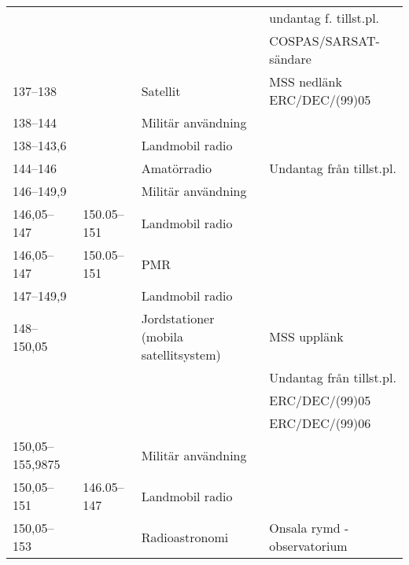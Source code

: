 \begin{landscape}
\begin{longtable}{llll}
	                   &                    &                                       & undantag f. tillst.pl.         \\
	                   &                    &                                       & COSPAS/SARSAT-sändare          \\
	137--138           &                    & Satellit                              & MSS nedlänk ERC/DEC/(99)05     \\
	138--144           &                    & Militär användning                    &                                \\
	138--143,6         &                    & Landmobil radio                       &                                \\
	144--146           &                    & Amatörradio                           & Undantag från tillst.pl.       \\
	146--149,9         &                    & Militär användning                    &                                \\
	146,05--147        & 150.05--151        & Landmobil radio                       &                                \\
	146,05--147        & 150.05--151        & PMR                                   &                                \\
	147--149,9         &                    & Landmobil radio                       &                                \\
	148--150,05        &                    & Jordstationer (mobila satellitsystem) & MSS upplänk                    \\
	                   &                    &                                       & Undantag från tillst.pl.       \\
	                   &                    &                                       & ERC/DEC/(99)05                 \\
	                   &                    &                                       & ERC/DEC/(99)06                 \\
	150,05--155,9875   &                    & Militär användning                    &                                \\
	150,05--151        & 146.05--147        & Landmobil radio                       &                                \\
	150,05--153        &                    & Radioastronomi                        & Onsala rymd - observatorium    \\

\end{longtable}
\end{landscape}
